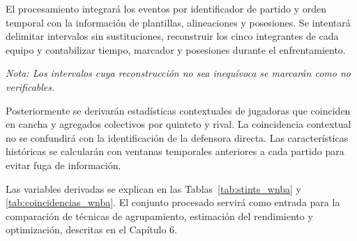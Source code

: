 El procesamiento integrará los eventos por identificador de partido y orden temporal con la información de plantillas, alineaciones y posesiones. Se intentará delimitar intervalos sin sustituciones, reconstruir los cinco integrantes de cada equipo y contabilizar tiempo, marcador y posesiones durante el enfrentamiento.

\textit{Nota: Los intervalos cuya reconstrucción no sea inequívoca se marcarán como no verificables.}

Posteriormente se derivarán estadísticas contextuales de jugadoras que coinciden en cancha y agregados colectivos por quinteto y rival. La coincidencia contextual no se confundirá con la identificación de la defensora directa. Las características históricas se calcularán con ventanas temporales anteriores a cada partido para evitar fuga de información.

Las variables derivadas se explican en las Tablas~\ref{tab:stints_wnba} y \ref{tab:coincidencias_wnba}. El conjunto procesado servirá como entrada para la comparación de técnicas de agrupamiento, estimación del rendimiento y optimización, descritas en el Capítulo 6.